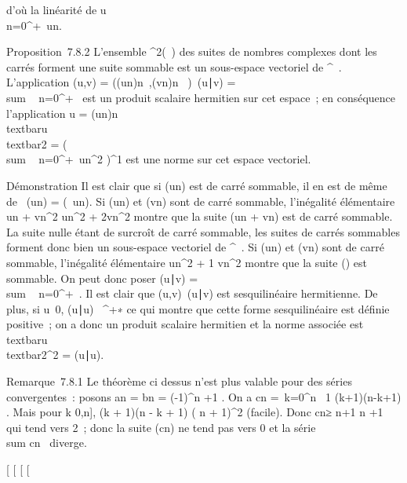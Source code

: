 d'où la linéarité de
u\mapsto~\\\sum
 n=0^+\infty~un.

Proposition~7.8.2 L'ensemble \ell^2(~) des suites de nombres
complexes dont les carrés forment une suite sommable est un sous-espace
vectoriel de ^~. L'application (u,v) = \left
((un)n\in{}~,(vn)n\in{}~\right
)\mapsto~(u\mathrel∣v)
= \\sum ~
n=0^+\infty~\overlineunvn
est un produit scalaire hermitien sur cet espace~; en conséquence
l'application u =
(un)n\in{}~\mapsto~\\textbar{}u\\textbar{}2
= \left
(\\sum ~
n=0^+\infty~\textbar{}un\textbar{}^2\right
)^1 est une norme sur cet espace vectoriel.

Démonstration Il est clair que si (un) est de carré sommable,
il en est de même de \alpha~(un) = (\alpha~un). Si
(un) et (vn) sont de carré sommable, l'inégalité
élémentaire \textbar{}un + vn\textbar{}^2
\textbar{}un\textbar{}^2 +
2\textbar{}vn\textbar{}^2 montre que la suite
(un + vn) est de carré sommable. La suite nulle
étant de surcroît de carré sommable, les suites de carrés sommables
forment donc bien un sous-espace vectoriel de ^~. Si
(un) et (vn) sont de carré sommable, l'inégalité
élémentaire
\textbar{}\overlineunvn\textbar{}  \textbar{}un\textbar{}^2
+ 1 
\textbar{}vn\textbar{}^2 montre que la suite
(\overlineunvn) est sommable. On
peut donc poser (u∣v)
= \\sum ~
n=0^+\infty~\overlineunvn.
Il est clair que
(u,v)\mapsto~(u\mathrel∣v) est
sesquilinéaire hermitienne. De plus, si u\neq~0,
(u∣u) \in {}~^+∗ ce qui montre que
cette forme sesquilinéaire est définie positive~; on a donc un produit
scalaire hermitien et la norme associée est
\\textbar{}u\\textbar{}2^2
= (u∣u).

Remarque~7.8.1 Le théorème ci dessus n'est plus valable pour des séries
convergentes~: posons an = bn = (-1)^n
\over \sqrtn+1 . On a
\textbar{}cn\textbar{} =\
\sum  k=0^n~ 1
\over \sqrt(k+1)(n-k+1) . Mais pour
k \in {[}0,n{]}, (k + 1)(n - k + 1) \leq ( n  +
1)^2 (facile). Donc \textbar{}cn\textbar{}≥ n+1
\over  n \over 2 +1 qui tend vers
2~; donc la suite (cn) ne tend pas vers 0 et la série
\\sum  cn~
diverge.

{[}
{[}
{[}
{[}
